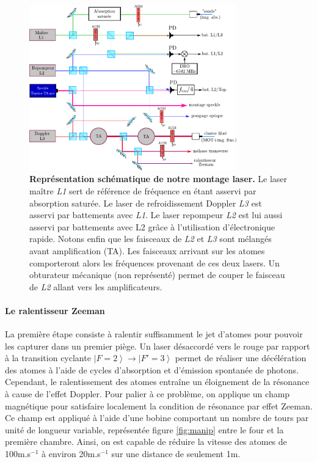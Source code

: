 \begin{figure}
\centering
\includegraphics[width=0.8\textwidth]{Fig/BEC_manip/table_optique2.pdf}
\caption{\textbf{Représentation schématique de notre montage laser.} Le laser maître \emph{L1} sert de référence de fréquence en étant asservi par absorption saturée. Le laser de refroidissement Doppler \emph{L3} est asservi par battements avec \emph{L1}. Le laser repompeur \emph{L2} est lui aussi asservi par battements avec L2 grâce à l'utilisation d'électronique rapide. Notons enfin que les faisceaux de \emph{L2} et \emph{L3} sont mélangés avant amplification (TA). Les faisceaux arrivant sur les atomes comporteront alors les fréquences provenant de ces deux lasers. Un obturateur mécanique (non représenté) permet de couper le faisceau de \emph{L2} allant vers les amplificateurs.}
\label{fig:table_optique}
\end{figure}

\paragraph*{Le ralentisseur Zeeman}
La première étape consiste à ralentir suffisamment le jet d'atomes pour pouvoir les capturer dans un premier piège. Un laser désaccordé vers le rouge par rapport à la transition cyclante $\left| F=2 \right\rangle \rightarrow\left| F'=3 \right\rangle$ permet de réaliser une décélération des atomes à l'aide de cycles d'absorption et d'émission spontanée de photons. Cependant, le ralentissement des atomes entraîne un éloignement de la résonance à cause de l'effet Doppler. Pour palier à ce problème, on applique un champ magnétique pour satisfaire localement la condition de résonance par effet Zeeman. Ce champ est appliqué à l'aide d'une bobine comportant un nombre de tours par unité de longueur variable, représentée figure \ref{fig:manip} entre le four et la première chambre.
Ainsi, on est capable de réduire la vitesse des atomes de 100m.s${}^{-1}$ à environ 20m.s${}^{-1}$ sur une distance de seulement 1m.

